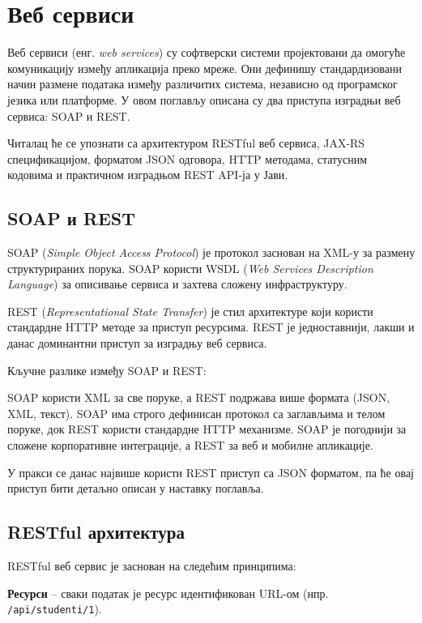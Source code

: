 \setlength{\parindent}{15pt}
\setlength{\parskip}{0pt}
\chapter{Веб сервиси}

Веб сервиси (енг. \textit{web services}) су софтверски системи пројектовани да омогуће комуникацију између апликација преко мреже. Они дефинишу стандардизовани начин размене података између различитих система, независно од програмског језика или платформе. У овом поглављу описана су два приступа изградњи веб сервиса: SOAP и REST.

Читалац ће се упознати са архитектуром RESTful веб сервиса, JAX-RS спецификацијом, форматом JSON одговора, HTTP методама, статусним кодовима и практичном изградњом REST API-ја у Јави.


\section{SOAP и REST}

SOAP (\textit{Simple Object Access Protocol}) је протокол заснован на XML-у за размену структурираних порука. SOAP користи WSDL (\textit{Web Services Description Language}) за описивање сервиса и захтева сложену инфраструктуру.

REST (\textit{Representational State Transfer}) је стил архитектуре који користи стандардне HTTP методе за приступ ресурсима. REST је једноставнији, лакши и данас доминантни приступ за изградњу веб сервиса.

Кључне разлике између SOAP и REST:

SOAP користи XML за све поруке, а REST подржава више формата (JSON, XML, текст). SOAP има строго дефинисан протокол са заглављима и телом поруке, док REST користи стандардне HTTP механизме. SOAP је погоднији за сложене корпоративне интеграције, а REST за веб и мобилне апликације.

У пракси се данас највише користи REST приступ са JSON форматом, па ће овај приступ бити детаљно описан у наставку поглавља.


\section{RESTful архитектура}

RESTful веб сервис је заснован на следећим принципима:

\textbf{Ресурси} – сваки податак је ресурс идентификован URL-ом (нпр. \texttt{/api/studenti/1}).

